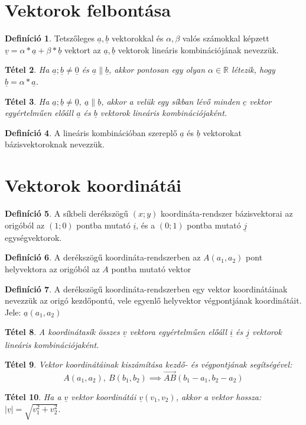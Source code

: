 \documentclass[twoside,12pt]{report}
\renewcommand{\vec}{\underline}
\newtheorem{theorem}{Tétel}[section]
\theoremstyle{definition}
\newtheorem{definition}[theorem]{Definíció}
\begin{document}
\section{Vektorok felbontása}
	\begin{definition}
		Tetszőleges $\vec{a},\vec{b}$ vektorokkal és $\alpha,\beta$ valós számokkal képzett $\vec{v}=\alpha*\vec{a}+\beta*\vec{b}$ vektort az $\vec{a},\vec{b}$ vektorok lineáris kombinációjának nevezzük.
	\end{definition}
	\begin{theorem}
		Ha $\vec{a};\vec{b}\ne\vec{0}$ és $\vec{a}\|\vec{b}$, akkor pontosan egy olyan $\alpha\in\mathbb{R}$ létezik, hogy $\vec{b}=\alpha*\vec{a}$.
	\end{theorem}
	\begin{theorem}
		Ha $\vec{a};\vec{b}\ne\vec{0},\ \vec{a}\|\vec{b}$, akkor a velük egy síkban lévő minden $\vec{c}$ vektor egyértelműen előáll $\vec{a}$ és $\vec{b}$ vektorok lineáris kombinációjaként.
	\end{theorem}
	\begin{definition}
		A lineáris kombinációban szereplő $\vec{a}$ és $\vec{b}$ vektorokat bázisvektoroknak nevezzük.
	\end{definition}
\section{Vektorok koordinátái}
	\begin{definition}
		A síkbeli derékszögű $(x;y)$ koordináta-rendszer bázisvektorai az origóból az $(1;0)$ pontba mutató $\vec{i}$, és a $(0;1)$ pontba mutató $\vec{j}$ egységvektorok.
	\end{definition}
	\begin{definition}
		A derékszögű koordináta-rendszerben az $A(a_1,a_2)$ pont helyvektora az origóból az $A$ pontba mutató vektor
	\end{definition}
	\begin{definition}
		A derékszögű koordináta-rendszerben egy vektor koordinátáinak nevezzük az origó kezdőpontú, vele egyenlő helyvektor végpontjának koordinátáit. Jele: $\vec{a}(a_1,a_2)$
	\end{definition}
	\begin{theorem}
		A koordinátasík összes $\vec{v}$ vektora egyértelműen előáll $\vec{i}$ és $\vec{j}$ vektorok lineáris kombinációjaként.
	\end{theorem}
	\begin{theorem}
		Vektor koordinátáinak kiszámítása kezdő- és végpontjának segítségével:
		\begin{equation*}
			A(a_1,a_2),\ B(b_1,b_2)\implies \overrightarrow{AB}(b_1-a_1,b_2-a_2)
		\end{equation*}
	\end{theorem}
	\begin{theorem}
		Ha a $\vec{v}$ vektor koordinátái $\vec{v}(v_1,v_2)$, akkor a vektor hossza: $|\vec{v}|=\sqrt{v_1^2+v_2^2}$.
	\end{theorem}
\end{document}
